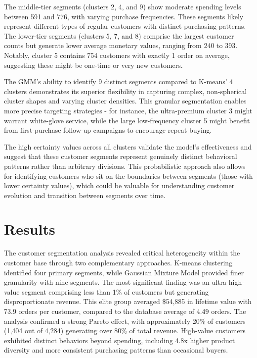 \documentclass[
]{article}
\begin{document}
The middle-tier segments (clusters 2, 4, and 9) show moderate spending
levels between 591 and 776, with varying purchase frequencies. These
segments likely represent different types of regular customers with
distinct purchasing patterns. The lower-tier segments (clusters 5, 7,
and 8) comprise the largest customer counts but generate lower average
monetary values, ranging from 240 to 393. Notably, cluster 5 contains
754 customers with exactly 1 order on average, suggesting these might be
one-time or very new customers.

The GMM's ability to identify 9 distinct segments compared to K-means' 4
clusters demonstrates its superior flexibility in capturing complex,
non-spherical cluster shapes and varying cluster densities. This
granular segmentation enables more precise targeting strategies - for
instance, the ultra-premium cluster 3 might warrant white-glove service,
while the large low-frequency cluster 5 might benefit from
first-purchase follow-up campaigns to encourage repeat buying.

The high certainty values across all clusters validate the model's
effectiveness and suggest that these customer segments represent
genuinely distinct behavioral patterns rather than arbitrary divisions.
This probabilistic approach also allows for identifying customers who
sit on the boundaries between segments (those with lower certainty
values), which could be valuable for understanding customer evolution
and transition between segments over time.

\section{Results}\label{results}

The customer segmentation analysis revealed critical heterogeneity
within the customer base through two complementary approaches. K-means
clustering identified four primary segments, while Gaussian Mixture
Model provided finer granularity with nine segments. The most
significant finding was an ultra-high-value segment comprising less than
1\% of customers but generating disproportionate revenue. This elite
group averaged \$54,885 in lifetime value with 73.9 orders per customer,
compared to the database average of 4.49 orders. The analysis confirmed
a strong Pareto effect, with approximately 20\% of customers (1,404 out
of 4,284) generating over 80\% of total revenue. High-value customers
exhibited distinct behaviors beyond spending, including 4.8x higher
product diversity and more consistent purchasing patterns than
occasional buyers.
\end{document}

